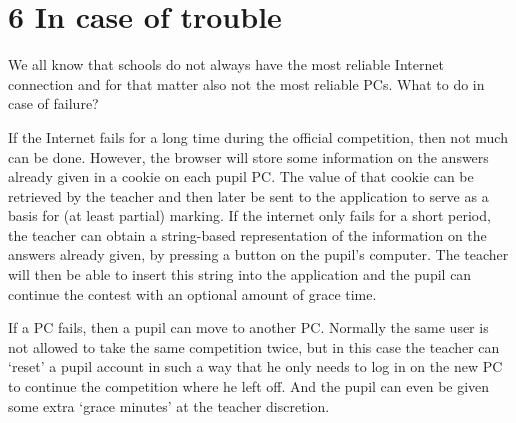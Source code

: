 \section*{6 In case of trouble}

We all know that schools do not always have the most reliable Internet connection and for that matter also not the most reliable PCs. What to do in case of failure?

If the Internet fails for a long time during the official competition, then not much can be done. However, the browser will store some information on the answers already given in a cookie on each pupil PC. The value of that cookie can be retrieved by the teacher and then later be sent to the application to serve as a basis for (at least partial) marking. If the internet only fails for a short period, the teacher can obtain a string-based representation of the information on the answers already given, by pressing a button on the pupil's computer. The teacher will then be able to insert this string into the application and the pupil can continue the contest with an optional amount of grace time. 

If a PC fails, then a pupil can move to another PC. Normally the same user is not allowed to take the same competition twice, but in this case the teacher can `reset' a pupil account in such a way that he only needs to log in on the new PC to continue the competition where he left off. And the pupil can even be given some extra `grace minutes' at the teacher discretion. 